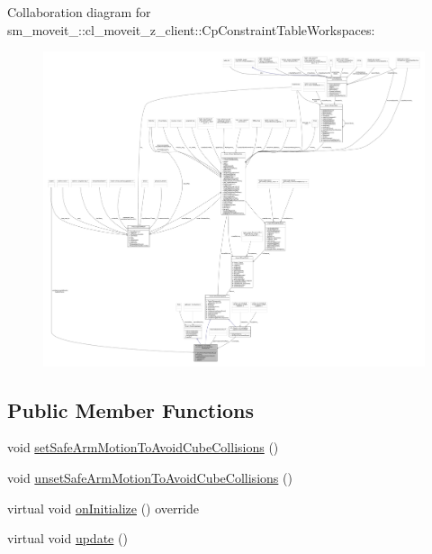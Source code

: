 Collaboration diagram for sm\+\_\+moveit\+\_\+:\+:cl\+\_\+moveit\+\_\+z\+\_\+client\+:\+:Cp\+Constraint\+Table\+Workspaces\+:
\nopagebreak
\begin{figure}[H]
\begin{center}
\leavevmode
\includegraphics[width=350pt]{classsm__moveit__4_1_1cl__moveit__z__client_1_1CpConstraintTableWorkspaces__coll__graph}
\end{center}
\end{figure}
\subsection*{Public Member Functions}
\begin{DoxyCompactItemize}
\item 
void \hyperlink{classsm__moveit__4_1_1cl__moveit__z__client_1_1CpConstraintTableWorkspaces_aa486721739e624c29765c61b6ea69908}{set\+Safe\+Arm\+Motion\+To\+Avoid\+Cube\+Collisions} ()
\item 
void \hyperlink{classsm__moveit__4_1_1cl__moveit__z__client_1_1CpConstraintTableWorkspaces_a655390e82677d21a5f753924fe10e732}{unset\+Safe\+Arm\+Motion\+To\+Avoid\+Cube\+Collisions} ()
\item 
virtual void \hyperlink{classsm__moveit__4_1_1cl__moveit__z__client_1_1CpConstraintTableWorkspaces_a86292aeca8f4672617b6ea617dfb4a73}{on\+Initialize} () override
\item 
virtual void \hyperlink{classsm__moveit__4_1_1cl__moveit__z__client_1_1CpConstraintTableWorkspaces_ae0b53f2cceedd97e053e66b1df2d9486}{update} ()
\end{DoxyCompactItemize}
